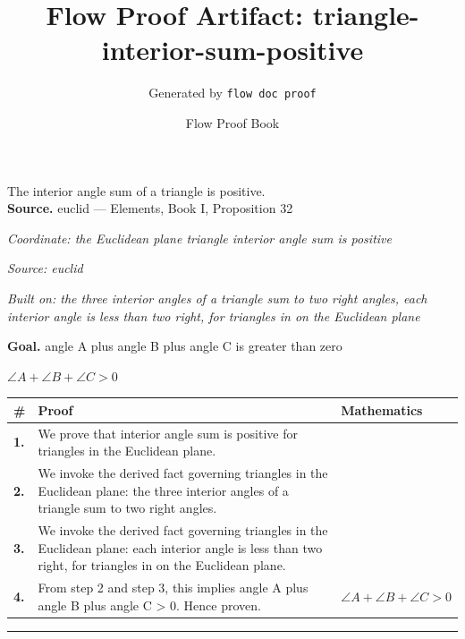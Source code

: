 \documentclass[11pt]{article}
\title{Flow Proof Artifact: triangle-interior-sum-positive}
\author{Generated by \texttt{flow doc proof}}
\date{Flow Proof Book}
\theoremstyle{definition}
\begin{document}
\maketitle
The interior angle sum of a triangle is positive.\\[0.5em]
\textbf{Source.} euclid — Elements, Book I, Proposition 32\\[0.5em]
\bigskip
{}\par
\smallskip\noindent\textit{Coordinate: the Euclidean plane \cdot triangle \cdot interior angle sum is positive}\par
\smallskip\noindent\textit{Source: euclid}\par
\smallskip\noindent\textit{Built on: the three interior angles of a triangle sum to two right angles, each interior angle is less than two right, for triangles in on the Euclidean plane}\par
\medskip
\noindent\textbf{Goal.} angle A plus angle B plus angle C is greater than zero\par
\noindent$\displaystyle \angle A + \angle B + \angle C > 0$\par
\medskip
\noindent
\begin{tabular}{@{} >{\raggedright\arraybackslash}p{} >{\raggedright\arraybackslash}p{} >{\raggedleft\arraybackslash}p{} @{}}
\textbf{\#} & \textbf{Proof} & \textbf{Mathematics} \\
\midrule
\textbf{1.} & We prove that interior angle sum is positive for triangles in the Euclidean plane. & \\[0.45em]
\textbf{2.} & We invoke the derived fact governing triangles in the Euclidean plane: the three interior angles of a triangle sum to two right angles. & \\[0.45em]
\textbf{3.} & We invoke the derived fact governing triangles in the Euclidean plane: each interior angle is less than two right, for triangles in on the Euclidean plane. & \\[0.45em]
\textbf{4.} & From step 2 and step 3, this implies angle A plus angle B plus angle C > 0. Hence proven. & $\displaystyle \angle A + \angle B + \angle C > 0$ \\[0.45em]
\bottomrule
\end{tabular}
\label{thm:Geometry-triangle-interior_angle_sum_is_positive}
\par\medskip\hrule
\end{document}
